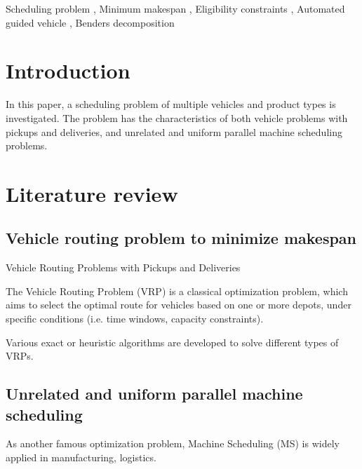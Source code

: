 \documentclass[preprint,12pt,authoryear]{elsarticle}
\begin{document}
\begin{frontmatter}
\begin{keyword}
    Scheduling problem \sep
    Minimum makespan \sep
    Eligibility constraints \sep
    Automated guided vehicle \sep
    Benders decomposition



\end{keyword}

\end{frontmatter}


\section{Introduction}

In this paper, a scheduling problem of multiple vehicles and product types is investigated. 
The problem has the  characteristics of both vehicle problems with pickups and deliveries,
and unrelated and uniform parallel machine scheduling problems.


\section{Literature review}

\subsection{Vehicle routing problem to minimize makespan}

Vehicle Routing Problems with Pickups and Deliveries

The Vehicle Routing Problem (VRP) is a classical optimization problem, 
which aims to select the optimal route for vehicles based on one or more depots,
under specific conditions (i.e. time windows, capacity constraints).

Various exact or heuristic algorithms are developed to solve different types of VRPs.

\subsection{Unrelated and uniform parallel machine scheduling}

As another famous optimization problem, Machine Scheduling (MS) 
is widely applied in manufacturing, logistics.
\end{document}
